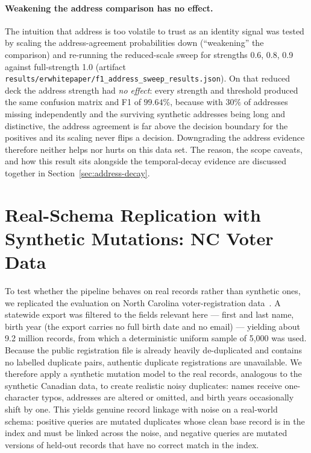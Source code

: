 \documentclass[11pt]{article}
\begin{document}
\paragraph{Weakening the address comparison has no effect.}
The intuition that address is too volatile to trust as an identity signal was tested by scaling the address-agreement probabilities down (``weakening'' the comparison) and re-running the reduced-scale sweep for strengths 0.6, 0.8, 0.9 against full-strength 1.0 (artifact \texttt{results/erwhitepaper/f1\_address\_sweep\_results.json}). On that reduced deck the address strength had \emph{no effect}: every strength and threshold produced the same confusion matrix and F1 of $99.64\%$, because with $30\%$ of addresses missing independently and the surviving synthetic addresses being long and distinctive, the address agreement is far above the decision boundary for the positives and its scaling never flips a decision. Downgrading the address evidence therefore neither helps nor hurts on this data set. The reason, the scope caveats, and how this result sits alongside the temporal-decay evidence are discussed together in Section~\ref{sec:address-decay}.

\section{Real-Schema Replication with Synthetic Mutations: NC Voter Data}
\label{sec:ncvoter-replication}
To test whether the pipeline behaves on real records rather than synthetic ones, we replicated the evaluation on North Carolina voter-registration data~\cite{ncvoter}. A statewide export was filtered to the fields relevant here --- first and last name, birth year (the export carries no full birth date and no email) --- yielding about 9.2 million records, from which a deterministic uniform sample of 5{,}000 was used. Because the public registration file is already heavily de-duplicated and contains no labelled duplicate pairs, authentic duplicate registrations are unavailable. We therefore apply a synthetic mutation model to the real records, analogous to the synthetic Canadian data, to create realistic noisy duplicates: names receive one-character typos, addresses are altered or omitted, and birth years occasionally shift by one. This yields genuine record linkage with noise on a real-world schema: positive queries are mutated duplicates whose clean base record is in the index and must be linked across the noise, and negative queries are mutated versions of held-out records that have no correct match in the index.
\end{document}
